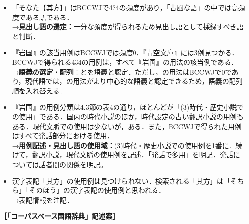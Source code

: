 \documentclass[japanese]{jnlp_1.4}
\newcommand{\MaruOne}{}
\newcommand{\MaruTwo}{}
\begin{document}
\begin{itemize}
\item
「そなた【其方】」はBCCWJで434の頻度があり，「古風な語」の中では高頻度である語である．\\
→\textbf{見出し語の選定：}十分な頻度が得られるため見出し語として採録すべき語と判断．

\item
『岩国』\MaruOne の該当用例はBCCWJでは頻度0．『青空文庫』には3例見つかる．BCCWJで得られる434の用例は，すべて『岩国』\MaruTwo の用法の該当例である．\\
→\textbf{語義の選定・配列：}\MaruOne と\MaruTwo を語義と認定．ただし，\MaruOne の用法はBCCWJで0であり，現代語では，\MaruTwo の用法がより中心的な語義と認定できるため，語義の配列順を入れ替える．

\item
『岩国』\MaruTwo の用例分類は4.3節の表4の通り，ほとんどが「(3)時代・歴史小説での使用」である．国内の時代小説のほか，時代設定の古い翻訳小説の用例もある．現代文脈での使用は少ないが，ある．また，BCCWJで得られた用例はすべて発話部分における使用．\\
→\textbf{用例記述・見出し語の使用域：}(3)時代・歴史小説での使用例を1番に．続けて，翻訳小説，現代文脈の使用例を記述．「発話で多用」を明記．発話については話者間の関係を明記。

\item
漢字表記「其方」の使用例は見つけられない．検索される「其方」は「そちら」「そのほう」の漢字表記の使用例と思われる．\\
→表記情報を注記．
\end{itemize}

\textbf{［「コーパスベース国語辞典」記述案］}
\end{document}
